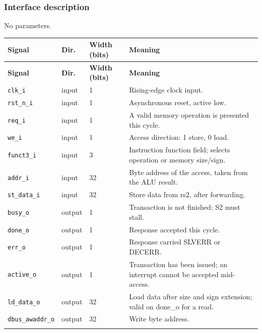 \documentclass[11pt]{article}
\begin{document}
\subsubsection{Interface description}
\noindent No parameters.\par\medskip
{\small
\begin{longtable}{@{}L{0.3400\dimexpr\linewidth-36pt\relax}L{0.1000\dimexpr\linewidth-36pt\relax}L{0.1000\dimexpr\linewidth-36pt\relax}L{0.4600\dimexpr\linewidth-36pt\relax}@{}}
\toprule
\textbf{Signal} & \textbf{Dir.} & \textbf{Width (bits)} & \textbf{Meaning} \\ \midrule
\endfirsthead
\toprule
\textbf{Signal} & \textbf{Dir.} & \textbf{Width (bits)} & \textbf{Meaning} \\ \midrule
\endhead
\texttt{clk\_i} & input & 1 & Rising-edge clock input. \\ \addlinespace[3pt]
\texttt{rst\_n\_i} & input & 1 & Asynchronous reset, active low. \\ \addlinespace[3pt]
\texttt{req\_i} & input & 1 & A valid memory operation is presented this cycle. \\ \addlinespace[3pt]
\texttt{we\_i} & input & 1 & Access direction: 1 store, 0 load. \\ \addlinespace[3pt]
\texttt{funct3\_i} & input & 3 & Instruction function field; selects operation or memory size/sign. \\ \addlinespace[3pt]
\texttt{addr\_i} & input & 32 & Byte address of the access, taken from the ALU result. \\ \addlinespace[3pt]
\texttt{st\_data\_i} & input & 32 & Store data from rs2, after forwarding. \\ \addlinespace[3pt]
\texttt{busy\_o} & output & 1 & Transaction is not finished; S2 must stall. \\ \addlinespace[3pt]
\texttt{done\_o} & output & 1 & Response accepted this cycle. \\ \addlinespace[3pt]
\texttt{err\_o} & output & 1 & Response carried SLVERR or DECERR. \\ \addlinespace[3pt]
\texttt{active\_o} & output & 1 & Transaction has been issued; an interrupt cannot be accepted mid-access. \\ \addlinespace[3pt]
\texttt{ld\_data\_o} & output & 32 & Load data after size and sign extension; valid on done\_o for a read. \\ \addlinespace[3pt]
\texttt{dbus\_awaddr\_o} & output & 32 & Write byte address. \\ \addlinespace[3pt]

\end{longtable}}
\end{document}
